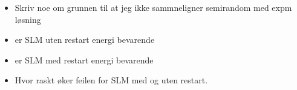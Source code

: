 \begin{itemize}
\item Skriv noe om grunnen til at jeg ikke sammneligner semirandom med expm løsning
\item er SLM uten restart energi bevarende
\item er SLM med restart energi bevarende
\item Hvor raskt øker feilen for SLM med og uten restart.
\end{itemize}